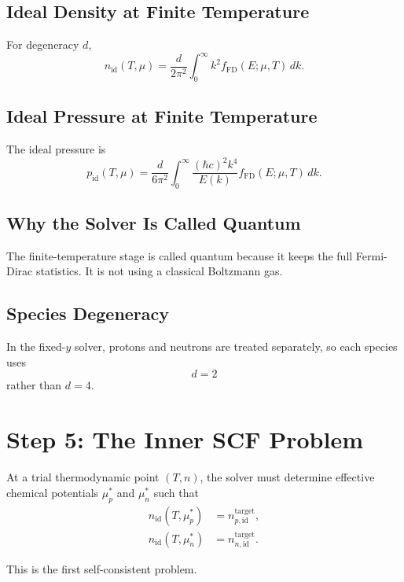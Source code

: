 \documentclass[11pt]{article}
\begin{document}
\subsection{Ideal Density at Finite Temperature}

For degeneracy $d$,
\begin{equation}
n_{\mathrm{id}}(T,\mu)
=
\frac{d}{2\pi^2}\int_0^\infty k^2 f_{\mathrm{FD}}(E;\mu,T)\,dk.
\end{equation}

\subsection{Ideal Pressure at Finite Temperature}

The ideal pressure is
\begin{equation}
p_{\mathrm{id}}(T,\mu)
=
\frac{d}{6\pi^2}\int_0^\infty
\frac{(\hbar c)^2k^4}{E(k)}f_{\mathrm{FD}}(E;\mu,T)\,dk.
\end{equation}

\subsection{Why the Solver Is Called Quantum}

The finite-temperature stage is called quantum because it keeps the full
Fermi-Dirac statistics. It is not using a classical Boltzmann gas.

\subsection{Species Degeneracy}

In the fixed-$y$ solver, protons and neutrons are treated separately, so each
species uses
\[
d=2
\]
rather than $d=4$.

\section{Step 5: The Inner SCF Problem}

At a trial thermodynamic point $(T,n)$, the solver must determine effective
chemical potentials $\mu_p^\ast$ and $\mu_n^\ast$ such that
\begin{align}
n_{\mathrm{id}}(T,\mu_p^\ast)
&=
n_{p,\mathrm{id}}^{\mathrm{target}}, \\
n_{\mathrm{id}}(T,\mu_n^\ast)
&=
n_{n,\mathrm{id}}^{\mathrm{target}}.
\end{align}

This is the first self-consistent problem.
\end{document}
